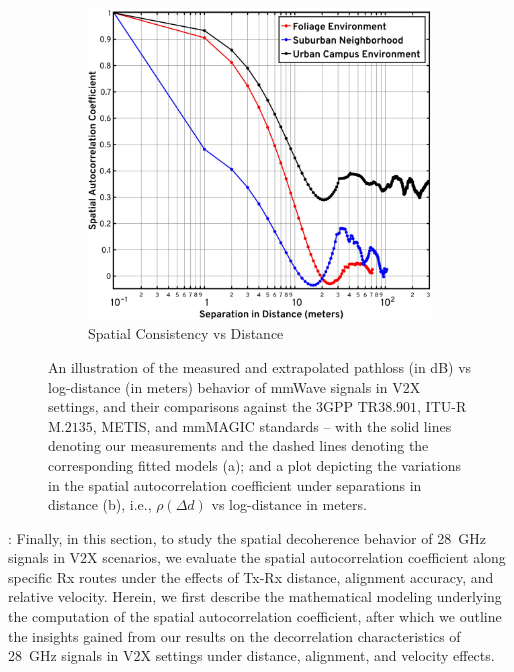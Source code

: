 \documentclass[12pt, draftcls, onecolumn]{IEEEtran}
\begin{document}
{\begin{figure} [t]
\begin{subfigure}{0.492\linewidth}
        \centering
        \includegraphics[width=1.0\linewidth]{figs/spatial_consistency_vs_distance.pdf}
        \caption{Spatial Consistency vs Distance}
        \label{F7b}
    \end{subfigure}
    \vspace{-8mm}
    \caption{An illustration of the measured and extrapolated pathloss (in dB) vs log-distance (in meters) behavior of mmWave signals in V$2$X settings, and their comparisons against the $3$GPP TR$38.901$, ITU-R M.$2135$, METIS, and mmMAGIC standards -- with the solid lines denoting our measurements and the dashed lines denoting the corresponding fitted models (a); and a plot depicting the variations in the spatial autocorrelation coefficient under separations in distance (b), i.e., $\rho(\Delta d)$ vs log-distance in meters.}
    \label{F7}
\end{figure}

: Finally, in this section, to study the spatial decoherence behavior of \SI{28}{\giga\hertz} signals in V$2$X scenarios, we evaluate the spatial autocorrelation coefficient along specific Rx routes under the effects of Tx-Rx distance, alignment accuracy, and relative velocity. Herein, we first describe the mathematical modeling underlying the computation of the spatial autocorrelation coefficient, after which we outline the insights gained from our results on the decorrelation characteristics of \SI{28}{\giga\hertz} signals in V$2$X settings under distance, alignment, and velocity effects.

}
\end{document}
